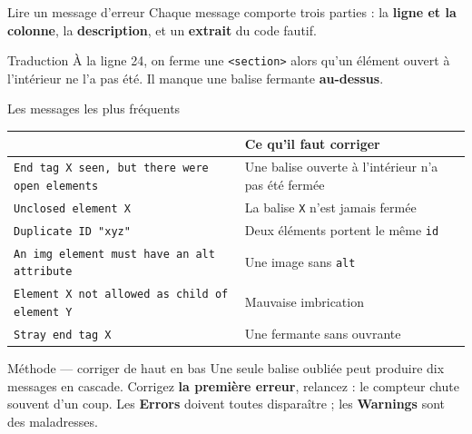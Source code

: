 \documentclass[aspectratio=169,11pt]{beamer}
\newcommand{\hdr}[1]{\multicolumn{1}{l}{\color{white}\bfseries #1}}
\begin{document}
\begin{frame}{Lire un message d'erreur}
  Chaque message comporte trois parties : la \textbf{ligne et la colonne}, la \textbf{description}, et un \textbf{extrait} du code fautif.
  \vspace{0.25cm}
  \begin{center}
  \end{center}
  \vspace{0.25cm}
  \begin{block}{Traduction}
    À la ligne 24, on ferme une \texttt{<section>} alors qu'un élément ouvert à l'intérieur ne l'a pas été. Il manque une balise fermante \textbf{au-dessus}.
  \end{block}
\end{frame}

\begin{frame}{Les messages les plus fréquents}
  \begin{center}
  \small
  \begin{tabularx}{0.97\textwidth}{p{5.6cm}X}
    \toprule
    \rowcolor{accentBlue}
    \hdr{Message} & \hdr{Ce qu'il faut corriger} \\
    \midrule
    \rowcolor{cfptGrey}
    \texttt{End tag X seen, but there were open elements} & Une balise ouverte à l'intérieur n'a pas été fermée \\
    \texttt{Unclosed element X} & La balise \texttt{X} n'est jamais fermée \\
    \rowcolor{cfptGrey}
    \texttt{Duplicate ID "xyz"} & Deux éléments portent le même \texttt{id} \\
    \texttt{An img element must have an alt attribute} & Une image sans \texttt{alt} \\
    \rowcolor{cfptGrey}
    \texttt{Element X not allowed as child of element Y} & Mauvaise imbrication \\
    \texttt{Stray end tag X} & Une fermante sans ouvrante \\
    \bottomrule
  \end{tabularx}
  \end{center}
  \vspace{0.25cm}
  \begin{alertblock}{Méthode --- corriger de haut en bas}
    Une seule balise oubliée peut produire dix messages en cascade. Corrigez \textbf{la première erreur}, relancez : le compteur chute souvent d'un coup. Les \textbf{Errors} doivent toutes disparaître ; les \textbf{Warnings} sont des maladresses.
  \end{alertblock}
\end{frame}
\end{document}
